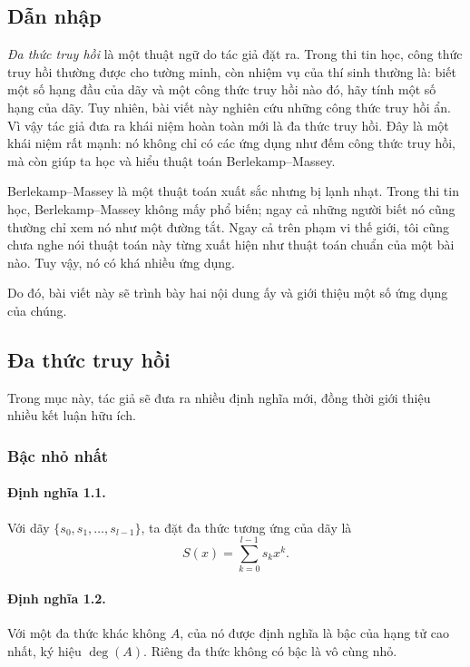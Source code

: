 \documentclass[11pt]{article}
\begin{document}
\subsection*{Dẫn nhập}

\emph{Đa thức truy hồi} là một thuật ngữ do tác giả đặt ra. Trong thi tin học,
công thức truy hồi thường được cho tường minh, còn nhiệm vụ của thí sinh
thường là: biết một số hạng đầu của dãy và một công thức truy hồi nào đó, hãy
tính một số hạng của dãy. Tuy nhiên, bài viết này nghiên cứu những công thức
truy hồi ẩn. Vì vậy tác giả đưa ra khái niệm hoàn toàn mới là đa thức truy
hồi. Đây là một khái niệm rất mạnh: nó không chỉ có các ứng dụng như đếm công
thức truy hồi, mà còn giúp ta học và hiểu thuật toán Berlekamp--Massey.

Berlekamp--Massey là một thuật toán xuất sắc nhưng bị lạnh nhạt. Trong thi tin
học, Berlekamp--Massey không mấy phổ biến; ngay cả những người biết nó cũng
thường chỉ xem nó như một đường tắt. Ngay cả trên phạm vi thế giới, tôi cũng
chưa nghe nói thuật toán này từng xuất hiện như thuật toán chuẩn của một bài
nào. Tuy vậy, nó có khá nhiều ứng dụng.

Do đó, bài viết này sẽ trình bày hai nội dung ấy và giới thiệu một số ứng dụng
của chúng.

\subsection{Đa thức truy hồi}

Trong mục này, tác giả sẽ đưa ra nhiều định nghĩa mới, đồng thời giới thiệu
nhiều kết luận hữu ích.

\subsubsection{Bậc nhỏ nhất}

\paragraph{Định nghĩa 1.1.}
Với dãy \(\{s_0,s_1,\ldots,s_{l-1}\}\), ta đặt đa thức tương ứng của dãy là
\[
  S(x)=\sum_{k=0}^{l-1}s_kx^k.
\]

\paragraph{Định nghĩa 1.2.}
Với một đa thức khác không \(A\),  của nó được định nghĩa là bậc của
hạng tử cao nhất, ký hiệu \(\deg(A)\). Riêng đa thức không có bậc là vô cùng
nhỏ.
\end{document}

